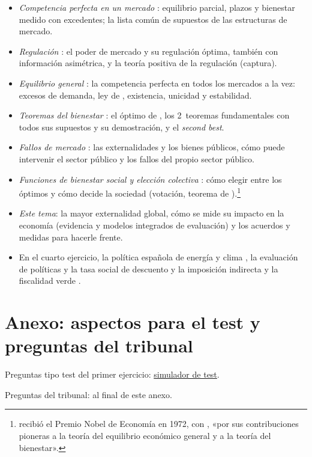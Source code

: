 \documentclass[11pt]{article}
\begin{document}
\begin{itemize}
\item \emph{Competencia perfecta en un mercado} : equilibrio parcial, plazos y bienestar medido con excedentes; la lista común de supuestos de las estructuras de mercado.
\item \emph{Regulación} : el poder de mercado y su regulación óptima, también con información asimétrica, y la teoría positiva de la regulación (captura).
\item \emph{Equilibrio general} : la competencia perfecta en todos los mercados a la vez: excesos de demanda, ley de , existencia, unicidad y estabilidad.
\item \emph{Teoremas del bienestar} : el óptimo de , los 2~teoremas fundamentales con todos sus supuestos y su demostración, y el \emph{second best}.
\item \emph{Fallos de mercado} : las externalidades y los bienes públicos, cómo puede intervenir el sector público y los fallos del propio sector público.
\item \emph{Funciones de bienestar social y elección colectiva} : cómo elegir entre los óptimos y cómo decide la sociedad (votación, teorema de ).\footnote{ recibió el Premio Nobel de Economía en 1972, con , «por sus contribuciones pioneras a la teoría del equilibrio económico general y a la teoría del bienestar»\nocite{Nobel1972HicksArrow}.}
\item \emph{Este tema}: la mayor externalidad global, cómo se mide su impacto en la economía (evidencia y modelos integrados de evaluación) y los acuerdos y medidas para hacerle frente.
\item En el cuarto ejercicio, la política española de energía y clima , la evaluación de políticas y la tasa social de descuento  y la imposición indirecta y la fiscalidad verde .
\end{itemize}

\section{Anexo: aspectos para el test y preguntas del tribunal}\label{anexo:test}

\begin{anotaciones}
Preguntas tipo test del primer ejercicio: \href{https://www.victorgutierrezmarcos.es/oposicion/temario/primer-ejercicio/test/simulador.html?tema=3.B.31}{simulador de test}.

Preguntas del tribunal: al final de este anexo.
\end{anotaciones}
\end{document}
